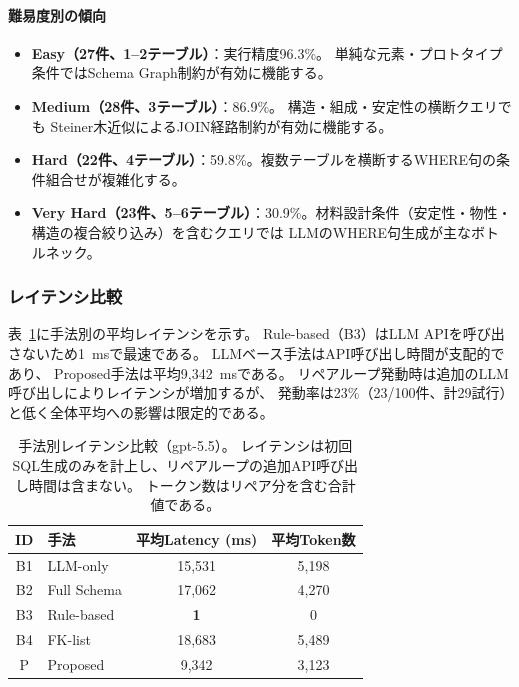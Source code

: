 \documentclass[5p,twocolumn]{elsarticle}
\begin{document}
\paragraph{難易度別の傾向}

\begin{itemize}
  \item \textbf{Easy（27件、1--2テーブル）}：実行精度96.3\%。
    単純な元素・プロトタイプ条件ではSchema Graph制約が有効に機能する。
  \item \textbf{Medium（28件、3テーブル）}：86.9\%。
    構造・組成・安定性の横断クエリでも
    Steiner木近似によるJOIN経路制約が有効に機能する。
  \item \textbf{Hard（22件、4テーブル）}：59.8\%。複数テーブルを横断するWHERE句の条件組合せが複雑化する。
  \item \textbf{Very Hard（23件、5--6テーブル）}：30.9\%。材料設計条件（安定性・物性・構造の複合絞り込み）を含むクエリでは
    LLMのWHERE句生成が主なボトルネック。
\end{itemize}

\subsubsection{レイテンシ比較}
\label{sec:scalability}

表~\ref{tab:latency}に手法別の平均レイテンシを示す。
Rule-based（B3）はLLM APIを呼び出さないため1~msで最速である。
LLMベース手法はAPI呼び出し時間が支配的であり、
Proposed手法は平均9{,}342~msである。
リペアループ発動時は追加のLLM呼び出しによりレイテンシが増加するが、
発動率は23\%（23/100件、計29試行）と低く全体平均への影響は限定的である。

\begin{table}[htbp]
  \centering
  \caption{手法別レイテンシ比較（gpt-5.5）。
  レイテンシは初回SQL生成のみを計上し、リペアループの追加API呼び出し時間は含まない。
  トークン数はリペア分を含む合計値である。}
  \label{tab:latency}
  \small
  \begin{tabular}{clcc}
    \toprule
    ID & 手法 & 平均Latency (ms) & 平均Token数 \\
    \midrule
    B1 & LLM-only & 15{,}531 & 5{,}198 \\
    B2 & Full Schema & 17{,}062 & 4{,}270 \\
    B3 & Rule-based & \textbf{1} & 0 \\
    B4 & FK-list & 18{,}683 & 5{,}489 \\
    P & Proposed & 9{,}342 & 3{,}123 \\
    \bottomrule
  \end{tabular}
\end{table}
\end{document}
